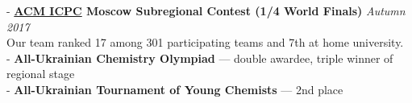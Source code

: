 \documentclass[11pt]{res}
\newcommand{\vmarginsmall}{\vspace{0.1cm}}
\newcommand{\vmargin}{\vspace{0.3cm}}
\begin{document}
\begin{resume}
- \textbf{\href{https://icpc.baylor.edu/}{ACM ICPC} Moscow Subregional Contest (1/4 World Finals)} \hfill{} \textit{Autumn 2017}\\
\hphantom{-} Our team ranked 17 among 301 participating teams and 7th at home university.\vmarginsmall\\
- \textbf{All-Ukrainian Chemistry Olympiad} — double awardee, triple winner of regional stage\\
- \textbf{All-Ukrainian Tournament of Young Chemists} — 2nd place

\end{resume}
\end{document}
